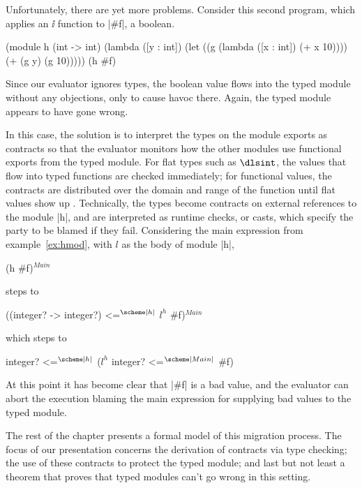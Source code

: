 \begin{schemeregion}
\label{sec:types-as-contracts}
Unfortunately, there are yet more problems. Consider this second
program, which applies an $\ii{}$ function to
 \scheme|#f|, a boolean.
\begin{exmp}
\begin{schemedisplay}
(module h (int -> int) 
  (lambda ([y : int]) 
    (let ((g (lambda ([x : int]) (+ x 10))))
      (+ (g y) (g 10)))))
(h #f)
\end{schemedisplay}
\label{ex:hmod}
\end{exmp}
Since our evaluator ignores types, the boolean value
 flows into the typed module without any objections, only to cause havoc
 there. Again, the typed module appears to have gone wrong. 

In this case, the solution is to interpret the types on the module exports
 as contracts so that the evaluator monitors how the other modules use
 functional exports from the typed module. For flat types such as $\dlsint$,
 the values that flow into typed functions are checked immediately; for
 functional values, the contracts are distributed over the domain and range
 of the function until flat values show up
 \cite{ff:ho-contracts}. Technically, the types become 
 contracts on external references to the module \scheme|h|, and are
 interpreted as runtime checks, or casts, which specify the party to
 be blamed if they fail.  Considering the main expression from
 example~\ref{ex:hmod}, with $l$ as the body of module \scheme|h|,
\begin{schemedisplay}
  (h #f)$^{Main}$
\end{schemedisplay}  
steps to
\begin{schemedisplay}
  ({(integer? -> integer?) <=$^{\scheme|h|}$ $l^h$} #f)$^{Main}$
\end{schemedisplay}   
which steps to
\begin{schemedisplay}
  {integer? <=$^{\scheme|h|}$ ($l^h$ {integer? <=$^{\scheme|Main|}$ #f})}
\end{schemedisplay}
 At this point it has become clear that \scheme|#f| is a bad value, and the
 evaluator can abort the execution blaming the main expression for supplying
 bad values to the typed module. 

 The rest of the chapter presents a formal model of this migration
 process. The focus of our presentation concerns the derivation of
 contracts via type checking; the use of these contracts
 to protect the typed module; and last but not least a theorem that proves that
 typed modules can't go wrong in this setting.
 
\end{schemeregion}
